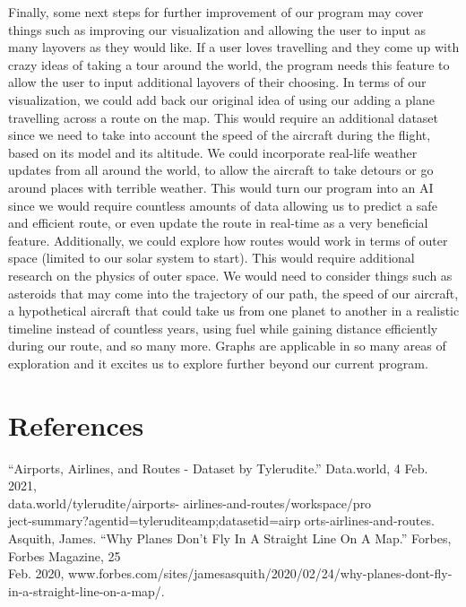 \documentclass[fontsize=11pt]{article}
\begin{document}
Finally, some next steps for further improvement of our program may cover things such as improving our visualization and allowing the user to input as many layovers as they would like. If a user loves travelling and they come up with crazy ideas of taking a tour around the world, the program needs this feature to allow the user to input additional layovers of their choosing. In terms of our visualization, we could add back our original idea of using our adding a plane travelling across a route on the map. This would require an additional dataset since we need to take into account the speed of the aircraft during the flight, based on its model and its altitude. We could incorporate real-life weather updates from all around the world, to allow the aircraft to take detours or go around places with terrible weather. This would turn our program into an AI since we would require countless amounts of data allowing us to predict a safe and efficient route, or even update the route in real-time as a very beneficial feature. Additionally, we could explore how routes would work in terms of outer space (limited to our solar system to start). This would require additional research on the physics of outer space. We would need to consider things such as asteroids that may come into the trajectory of our path, the speed of our aircraft, a hypothetical aircraft that could take us from one planet to another in a realistic timeline instead of countless years, using fuel while gaining distance efficiently during our route, and so many more. Graphs are applicable in so many areas of exploration and it excites us to explore further beyond our current program.

\section*{References}
“Airports, Airlines, and Routes - Dataset by Tylerudite.” Data.world, 4 Feb. 2021, \\ data.world/tylerudite/airports- airlines-and-routes/workspace/pro \\ ject-summary?agentid=tyleruditeamp;datasetid=airp orts-airlines-and-routes. \\

Asquith, James. “Why Planes Don’t Fly In A Straight Line On A Map.” Forbes, Forbes Magazine, 25 \\ Feb. 2020, www.forbes.com/sites/jamesasquith/2020/02/24/why-planes-dont-fly-in-a-straight-line-on-a-map/. \\
\end{document}
